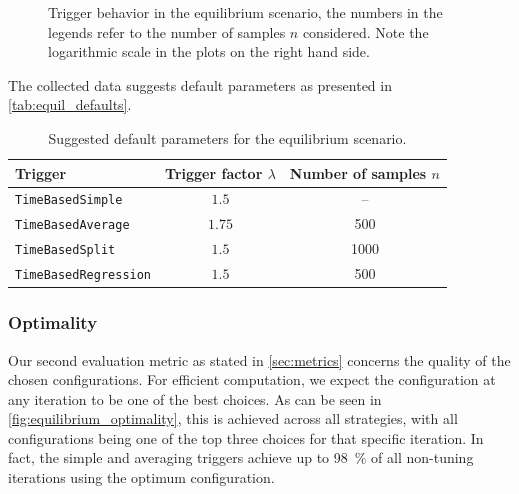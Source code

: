 \begin{figure}[htpb]
\begin{subfigure}{0.45\textwidth}
	\end{subfigure}%
	\caption{Trigger behavior in the equilibrium scenario, the numbers in the legends refer to the number of samples $n$ considered. Note the logarithmic scale in the plots on the right hand side.}
	\label{fig:params_equil}
\end{figure}

The collected data suggests default parameters as presented in \autoref{tab:equil_defaults}.
\begin{table}[htpb]
	\centering
	\begin{tabular}{lcc}
		\toprule
		\textbf{Trigger}             & \textbf{Trigger factor $\lambda$} & \textbf{Number of samples $n$} \\ [0em]
		\midrule
		\texttt{TimeBasedSimple}     & $1.5$                             & --                             \\
		\texttt{TimeBasedAverage}    & $1.75$                            & 500                            \\
		\texttt{TimeBasedSplit}      & $1.5$                             & 1000                           \\
		\texttt{TimeBasedRegression} & $1.5$                             & 500                            \\
		\bottomrule
	\end{tabular}
	\caption{Suggested default parameters for the equilibrium scenario.}
	\label{tab:equil_defaults}
\end{table}





\subsubsection{Optimality}
Our second evaluation metric as stated in \autoref{sec:metrics} concerns the quality of the chosen configurations. For efficient computation, we expect the configuration at any iteration to be one of the best choices. As can be seen in \autoref{fig:equilibrium_optimality}, this is achieved across all strategies, with all configurations being one of the top three choices for that specific iteration. In fact, the simple and averaging triggers achieve up to \qty{98}{\percent} of all non-tuning iterations using the optimum configuration.

